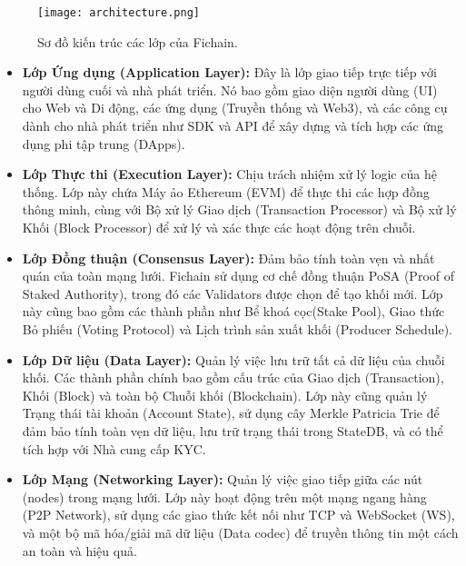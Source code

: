 \begin{figure}[h!]
    \centering
    \texttt{[image: architecture.png]} 
    \caption{Sơ đồ kiến trúc các lớp của Fichain.}
    \label{fig:architecture}
\end{figure}

\begin{itemize}
    \item \textbf{Lớp Ứng dụng (Application Layer):} Đây là lớp giao tiếp trực tiếp với người dùng cuối và nhà phát triển. Nó bao gồm giao diện người dùng (UI) cho Web và Di động, các ứng dụng (Truyền thống và Web3), và các công cụ dành cho nhà phát triển như SDK và API để xây dựng và tích hợp các ứng dụng phi tập trung (DApps).

    \item \textbf{Lớp Thực thi (Execution Layer):} Chịu trách nhiệm xử lý logic của hệ thống. Lớp này chứa Máy ảo Ethereum (EVM) để thực thi các hợp đồng thông minh, cùng với Bộ xử lý Giao dịch (Transaction Processor) và Bộ xử lý Khối (Block Processor) để xử lý và xác thực các hoạt động trên chuỗi.

    \item \textbf{Lớp Đồng thuận (Consensus Layer):} Đảm bảo tính toàn vẹn và nhất quán của toàn mạng lưới. Fichain sử dụng cơ chế đồng thuận PoSA (Proof of Staked Authority), trong đó các Validators được chọn để tạo khối mới. Lớp này cũng bao gồm các thành phần như Bể khoá cọc(Stake Pool), Giao thức Bỏ phiếu (Voting Protocol) và Lịch trình sản xuất khối (Producer Schedule).

    \item \textbf{Lớp Dữ liệu (Data Layer):} Quản lý việc lưu trữ tất cả dữ liệu của chuỗi khối. Các thành phần chính bao gồm cấu trúc của Giao dịch (Transaction), Khối (Block) và toàn bộ Chuỗi khối (Blockchain). Lớp này cũng quản lý Trạng thái tài khoản (Account State), sử dụng cây Merkle Patricia Trie để đảm bảo tính toàn vẹn dữ liệu, lưu trữ trạng thái trong StateDB, và có thể tích hợp với Nhà cung cấp KYC.

    \item \textbf{Lớp Mạng (Networking Layer):} Quản lý việc giao tiếp giữa các nút (nodes) trong mạng lưới. Lớp này hoạt động trên một mạng ngang hàng (P2P Network), sử dụng các giao thức kết nối như TCP và WebSocket (WS), và một bộ mã hóa/giải mã dữ liệu (Data codec) để truyền thông tin một cách an toàn và hiệu quả.
\end{itemize}
